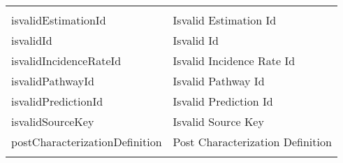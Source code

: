 \documentclass[
]{article}
\begin{document}
\begin{longtable}[]{@{}ll@{}}
\begin{minipage}[t]{0.48\columnwidth}
\end{minipage}\tabularnewline
\begin{minipage}[t]{0.46\columnwidth}\raggedright
isvalidEstimationId\strut
\end{minipage} & \begin{minipage}[t]{0.48\columnwidth}\raggedright
Isvalid Estimation Id\strut
\end{minipage}\tabularnewline
\begin{minipage}[t]{0.46\columnwidth}\raggedright
isvalidId\strut
\end{minipage} & \begin{minipage}[t]{0.48\columnwidth}\raggedright
Isvalid Id\strut
\end{minipage}\tabularnewline
\begin{minipage}[t]{0.46\columnwidth}\raggedright
isvalidIncidenceRateId\strut
\end{minipage} & \begin{minipage}[t]{0.48\columnwidth}\raggedright
Isvalid Incidence Rate Id\strut
\end{minipage}\tabularnewline
\begin{minipage}[t]{0.46\columnwidth}\raggedright
isvalidPathwayId\strut
\end{minipage} & \begin{minipage}[t]{0.48\columnwidth}\raggedright
Isvalid Pathway Id\strut
\end{minipage}\tabularnewline
\begin{minipage}[t]{0.46\columnwidth}\raggedright
isvalidPredictionId\strut
\end{minipage} & \begin{minipage}[t]{0.48\columnwidth}\raggedright
Isvalid Prediction Id\strut
\end{minipage}\tabularnewline
\begin{minipage}[t]{0.46\columnwidth}\raggedright
isvalidSourceKey\strut
\end{minipage} & \begin{minipage}[t]{0.48\columnwidth}\raggedright
Isvalid Source Key\strut
\end{minipage}\tabularnewline
\begin{minipage}[t]{0.46\columnwidth}\raggedright
postCharacterizationDefinition\strut
\end{minipage} & \begin{minipage}[t]{0.48\columnwidth}\raggedright
Post Characterization Definition\strut
\end{minipage}\tabularnewline
\begin{minipage}[t]{0.46\columnwidth}\raggedright

\end{minipage}
\end{longtable}
\end{document}
